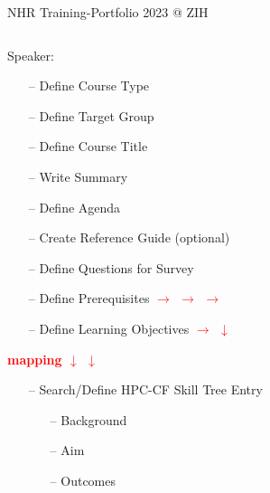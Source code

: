 \documentclass[compress,aspectratio=169]{beamer}
\begin{document}
\begin{frame}{NHR Training-Portfolio 2023 @ ZIH}
{
\footnotesize
\begin{columns}[T]
\hspace{1.25cm} \begin{column}{0.55\textwidth}
Speaker:
\begin{itemize}[itemsep=0pt]
 \item[--] Define Course Type
 \item[--] Define Target Group
 \item[--] Define Course Title
 \item[--] Write Summary 
 \item[--] Define Agenda
 \item[--] Create Reference Guide (optional)
 \item[--] Define Questions for Survey
 \item[--] Define Prerequisites  \textbf{\textcolor{red}{$\longrightarrow$ $\longrightarrow$ $\longrightarrow$ \hspace{0.01cm}  }}
 \item[--] Define Learning Objectives \textbf{\textcolor{red}{$\longrightarrow$  \hspace{0.13cm} $\downarrow$ }}  
 \end{itemize}
\vspace{-0.1cm}
\hspace{3.25cm} \textbf{\textcolor{red}{mapping $\downarrow$ \hspace{0.10cm}  $\downarrow$} }
\vspace{-0.1cm}
 
\begin{itemize}
 \item[--] Search/Define HPC-CF Skill Tree Entry
\vspace{-0.2cm}
 \begin{itemize}
  \item[--] {\footnotesize Background }
  \item[--] {\footnotesize Aim }
  \item[--] {\footnotesize Outcomes }
 \end{itemize}


\end{itemize}
\end{column}
\end{columns}}
\end{frame}
\end{document}
